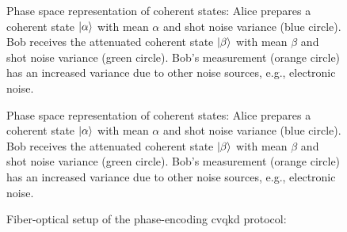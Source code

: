 \begin{figure}[htb]
	\centering
	
	\caption{Phase space representation of coherent states: Alice prepares a coherent state $\ket{\alpha}$ with mean $\alpha$ and shot noise variance (blue circle). Bob receives the attenuated coherent state $\ket{\beta}$ with mean $\beta$ and shot noise variance (green circle). Bob's measurement (orange circle) has an increased variance due to other noise sources, e.g., electronic noise.}
\end{figure}

\begin{figure}[htb]
	\centering
	
	\caption{Phase space representation of coherent states: Alice prepares a coherent state $\ket{\alpha}$ with mean $\alpha$ and shot noise variance (blue circle). Bob receives the attenuated coherent state $\ket{\beta}$ with mean $\beta$ and shot noise variance (green circle). Bob's measurement (orange circle) has an increased variance due to other noise sources, e.g., electronic noise.}
\end{figure}

\begin{figure}[htb]
	\centering
	
	\caption{Fiber-optical setup of the phase-encoding \gls{cvqkd} protocol:}
\end{figure}

